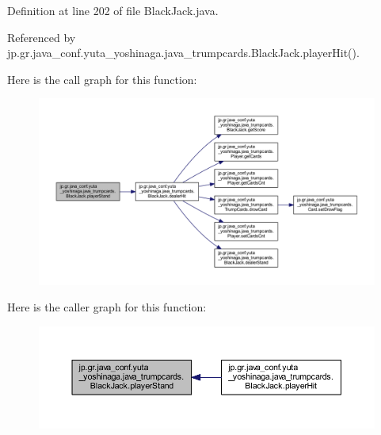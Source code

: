 Definition at line 202 of file Black\+Jack.\+java.



Referenced by jp.\+gr.\+java\+\_\+conf.\+yuta\+\_\+yoshinaga.\+java\+\_\+trumpcards.\+Black\+Jack.\+player\+Hit().

Here is the call graph for this function\+:
\nopagebreak
\begin{figure}[H]
\begin{center}
\leavevmode
\includegraphics[width=350pt]{classjp_1_1gr_1_1java__conf_1_1yuta__yoshinaga_1_1java__trumpcards_1_1_black_jack_a53f37ae6f1388143c70a8b138c6c2443_cgraph}
\end{center}
\end{figure}
Here is the caller graph for this function\+:
\nopagebreak
\begin{figure}[H]
\begin{center}
\leavevmode
\includegraphics[width=350pt]{classjp_1_1gr_1_1java__conf_1_1yuta__yoshinaga_1_1java__trumpcards_1_1_black_jack_a53f37ae6f1388143c70a8b138c6c2443_icgraph}
\end{center}
\end{figure}
\mbox{\label{classjp_1_1gr_1_1java__conf_1_1yuta__yoshinaga_1_1java__trumpcards_1_1_black_jack_a8fd066f80b7dd83f393a770bb24cd675}} 
